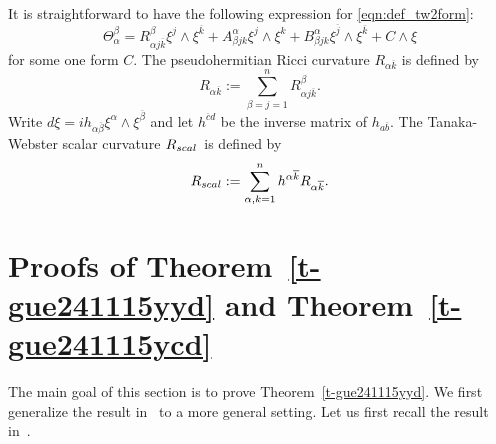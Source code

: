\documentclass[12pt]{amsart}
\theoremstyle{definition}
\theoremstyle{named}
\numberwithin{equation}{subsection}
\newcommand{\ol}{\overline}
\begin{document}
It is straightforward to have the following expression for \eqref{eqn:def_tw2form}:
\begin{equation}\label{eqn:tw2form compute}
    \Theta^\beta_\alpha=R^\beta_{\alpha j \overline{k}}\xi^{j}\wedge\xi^{\overline{k}}+ A^{\alpha}_{\beta j k}\xi^{j}\wedge\xi^k+B^\alpha
_{\beta j k}\xi^{\overline{j}}\wedge\xi^{\overline{k}}+C\wedge\xi
\end{equation} for some one form $C$.
The pseudohermitian Ricci curvature  $R_{\alpha \overline{k}}$ is defined by 
$$ R_{\alpha \overline{k}}:=\sum_{\beta=j=1}^n R^\beta_{\alpha j \overline{k}}. 
$$ 
Write $d\xi=ih_{\alpha\ol{\beta}}\xi^\alpha\wedge\xi^{\ol\beta}$ and let $h^{\ol cd}$ be the inverse matrix of $h_{a\ol b}$. 
The Tanaka-Webster scalar curvature $R_{{\rm scal\,}}$ is defined by 
\begin{equation}\label{e-gue241122yydI}
R_{\rm scal}:=\sum_{\alpha,k=1}^n h^{\alpha \overline{k}}R_{\alpha\overline{k}}.
\end{equation}





\section{Proofs of Theorem~\ref{t-gue241115yyd} and Theorem~\ref{t-gue241115ycd}}\label{s-gue241120yyd}
{\tiny{{\color{white}{\subsection{ }}}}}
The main goal of this section is to prove Theorem~\ref{t-gue241115yyd}. We first generalize the result in~\cite{Hsiao_Shen_2nd_coefficient_BS_2020} to a more general setting. Let us first recall the result in~\cite{Hsiao_Shen_2nd_coefficient_BS_2020}. 
\end{document}
